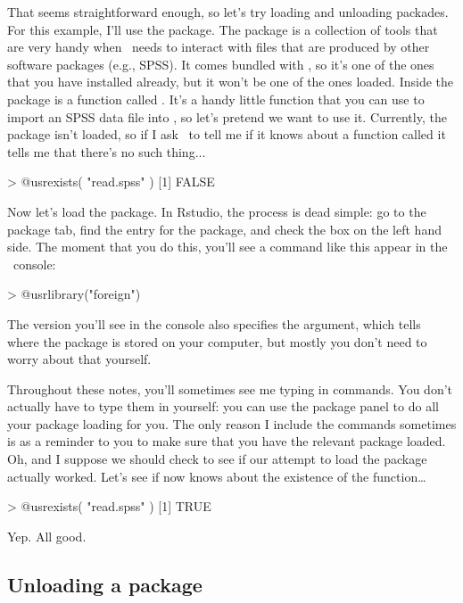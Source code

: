 That seems straightforward enough, so let's try loading and unloading packades. For this example, I'll use the  package. The  package is a collection of tools that are very handy when \R\ needs to interact with files that are produced by other software packages (e.g., SPSS). It comes bundled with \R, so it's one of the ones that you have installed already, but it won't be one of the ones loaded. Inside the  package is a function called . It's a handy little function that you can use to import an SPSS data file into \R, so let's pretend we want to use it. Currently, the  package isn't loaded, so if I ask \R\ to tell me if it knows about a function called  it tells me that there's no such thing...
\begin{rblock1}
> @usr{exists( "read.spss" )}
[1] FALSE 
\end{rblock1}
Now let's load the package. In Rstudio, the process is dead simple: go to the package tab, find the entry for the  package, and check the box on the left hand side. The moment that you do this, you'll see a command like this appear in the \R\ console:
\begin{rblock1}
> @usr{library("foreign")}
\end{rblock1}
The version you’ll see in the console also specifies the  argument, which tells \R where the package is stored on your computer, but mostly you don't need to worry about that yourself.

Throughout these notes, you'll sometimes see me typing in  commands. You don't actually have to type them in yourself: you can use the \Rstudio package panel to do all your package loading for you. The only reason I include the  commands sometimes is as a reminder to you to make sure that you have the relevant package loaded. Oh, and I suppose we should check to see if our attempt to load the package actually worked. Let's see if \R now knows about the existence of the  function\dots
\begin{rblock1}
> @usr{exists( "read.spss" )}
[1] TRUE 
\end{rblock1}
Yep. All good.



\subsection{Unloading a package\label{sec:packageunload}}


